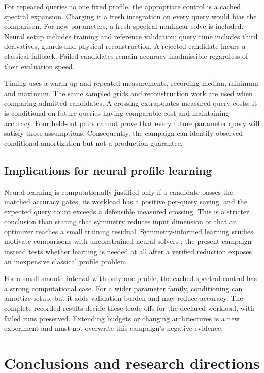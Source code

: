 \documentclass[12pt,a4paper,oneside]{report}
\numberwithin{equation}{chapter}
\begin{document}
For repeated queries to one fixed profile, the appropriate control is a
cached spectral expansion. Charging it a fresh integration on every query
would bias the comparison. For new parameters, a fresh spectral nonlinear
solve is included. Neural setup includes training and reference validation;
query time includes third derivatives, guards and physical reconstruction.
A rejected candidate incurs a classical fallback. Failed candidates remain
accuracy-inadmissible regardless of their evaluation speed.

Timing uses a warm-up and repeated measurements, recording median, minimum
and maximum. The same sampled grids and reconstruction work are used when
comparing admitted candidates. A crossing extrapolates measured query costs;
it is conditional on future queries having comparable cost and maintaining
accuracy. Four held-out pairs cannot prove that every future parameter query
will satisfy those assumptions. Consequently, the campaign can identify
observed conditional amortization but not a production guarantee.

\section{Implications for neural profile learning}
Neural learning is computationally justified only if a candidate passes the
matched accuracy gates, its workload has a positive per-query saving, and
the expected query count exceeds a defensible measured crossing. This is a
stricter conclusion than stating that symmetry reduces input dimension or
that an optimizer reaches a small training residual. Symmetry-informed
learning studies motivate comparisons with unconstrained neural solvers
\cite{sympinn}; the present campaign instead tests whether learning is needed
at all after a verified reduction exposes an inexpensive classical profile
problem.

For a small smooth interval with only one profile, the cached spectral
control has a strong computational case. For a wider parameter family,
conditioning can amortize setup, but it adds validation burden and may
reduce accuracy. The complete recorded results decide these trade-offs for
the declared workload, with failed runs preserved. Extending budgets or
changing architectures is a new experiment and must not overwrite this
campaign's negative evidence.

\chapter{Conclusions and research directions}\label{ch:conclusion}
\end{document}
